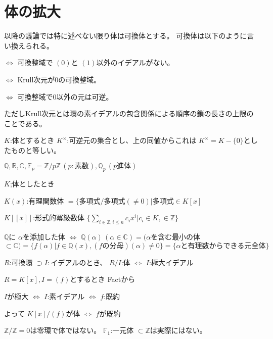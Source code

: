 \documentclass[../master_galois_theory]{subfiles}
\begin{document}
\setcounter{section}{0}

\section{体の拡大}

以降の議論では特に述べない限り体は可換体とする。
可換体は以下のように言い換えられる。

$\Leftrightarrow$ 可換整域で $(0)$と $(1)$以外のイデアルがない。

$\Leftrightarrow$ Krull次元が0の可換整域。

$\Leftrightarrow$ 可換整域で0以外の元は可逆。

ただしKrull次元とは環の素イデアルの包含関係による順序の鎖の長さの上限のことである。

$K$:体とするとき $K^\times$:可逆元の集合とし、上の同値からこれは $K^\times = K - \{ 0 \}$としたものと等しい。

\begin{exam}
  $\mathbb{Q}, \mathbb{R}, \mathbb{C}, \mathbb{F}_p = \mathbb{Z}/p\mathbb{Z} \, (p:素数), \mathbb{Q}_p \, (p進体)$
\end{exam}

\begin{exam}
  $K$;体としたとき

  $K(x)$:有理関数体 $= \{ 多項式 / 多項式(\neq 0) | 多項式 \in K[x]$

  $K[[x]]$:形式的冪級数体 $\{ \sum_{i \in \mathbb{Z} , i \leq n} c_i x^i | c_i \in K , \in \mathbb{Z} \}$

  $\mathbb{Q}$に $\alpha$を添加した体 $\Leftrightarrow$
  $\mathbb{Q}(\alpha) \, (\alpha \in \mathbb{C})
  = (\alpha$を含む最小の体 $\subset \mathbb{C})
  = \{ f(\alpha) | f \in \mathbb{Q}(x) , (fの分母)(\alpha) \neq 0 \}
  = \{ \alpha と有理数からできる元全体 \}$
\end{exam}

\begin{fact}
  $R$:可換環 $\supset I : イデアル$のとき、
  $R/I$:体 $\Leftrightarrow$ $I$:極大イデアル
\end{fact}

\begin{exam}
  $R = K[x] , I = (f)$とするとき Factから

  $I$が極大 $\Leftrightarrow$ $I$:素イデアル $\Leftrightarrow$ $f$:既約

  よって $K[x]/(f)$が体 $\Leftrightarrow$ $f$が既約
\end{exam}

\begin{rem}
  $\mathbb{Z}/\mathbb{Z} = 0$は零環で体ではない。
  $\mathbb{F}_1$:一元体 $\subset \mathbb{Z}$は実際にはない。
\end{rem}
\end{document}
